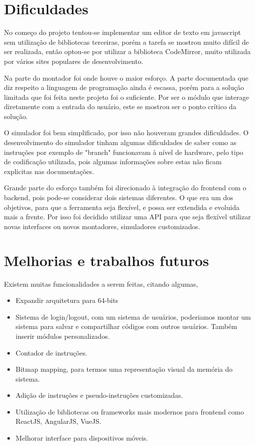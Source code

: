 \section{Dificuldades}

	No começo do projeto tentou-se implementar um editor de texto em javascript sem utilização de bibliotecas terceiras, porém a tarefa se mostrou muito difícil de ser realizada, então optou-se por utilizar a biblioteca CodeMirror, muito utilizada por vários sites populares de desenvolvimento.

	Na parte do montador foi onde houve o maior esforço. A parte documentada que diz respeito a linguagem de programação ainda é escassa, porém para a solução limitada que foi feita neste projeto foi o suficiente. Por ser o módulo que interage diretamente com a entrada do usuário, este se mostrou ser o ponto crítico da solução.

	O simulador foi bem simplificado, por isso não houveram grandes dificuldades. O desenvolvimento do simulador tinham algumas dificuldades de saber como as instruções por exemplo de "branch" funcionavam à nível de hardware, pelo tipo de codificação utilizada, pois algumas informações sobre estas não ficam explicitas nas documentações.

	Grande parte do esforço também foi direcionado à integração do frontend com o backend, pois pode-se considerar dois sistemas diferentes. O que era um dos objetivos, para que a ferramenta seja flexível, e possa ser extendida e evoluida mais a frente. Por isso foi decidido utilizar uma API para que seja flexível utilizar novas interfaces ou novos montadores, simuladores customizados.

\section{Melhorias e trabalhos futuros}

	Existem muitas funcionalidades a serem feitas, citando algumas,

	\begin{itemize}
		\item Expandir arquitetura para 64-bits
		\item Sistema de login/logout, com um sistema de usuários, poderiamos montar um sistema para salvar e compartilhar códigos com outros usuários. Também inserir módulos personalizados.
		\item Contador de instruções.
		\item Bitmap mapping, para termos uma representação visual da memória do sistema.
		\item Adição de instruções e pseudo-instruções customizadas.
		\item Utilização de bibliotecas ou frameworks mais modernos para frontend como ReactJS, AngularJS, VueJS.
		\item Melhorar interface para dispositivos móveis.		
	\end{itemize}

